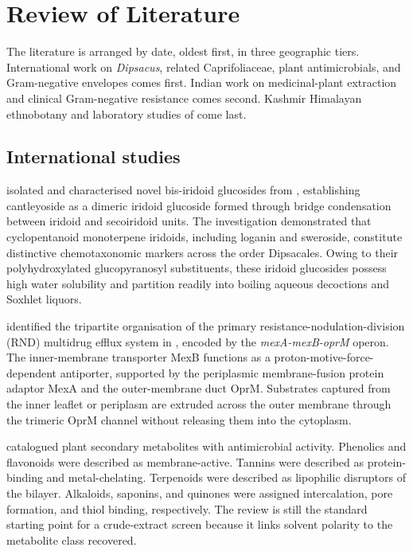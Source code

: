 
\chapter{Review of Literature}\label{ch:litreview}

The literature is arranged by date, oldest first, in three geographic tiers. International work on \textit{Dipsacus}, related Caprifoliaceae, plant antimicrobials, and Gram-negative envelopes comes first. Indian work on medicinal-plant extraction and clinical Gram-negative resistance comes second. Kashmir Himalayan ethnobotany and laboratory studies of  come last.

\section{International studies}

\citet{jensen1979cantleyoside} isolated and characterised novel bis-iridoid glucosides from , establishing cantleyoside as a dimeric iridoid glucoside formed through bridge condensation between iridoid and secoiridoid units. The investigation demonstrated that cyclopentanoid monoterpene iridoids, including loganin and sweroside, constitute distinctive chemotaxonomic markers across the order Dipsacales. Owing to their polyhydroxylated glucopyranosyl substituents, these iridoid glucosides possess high water solubility and partition readily into boiling aqueous decoctions and Soxhlet liquors.

\citet{li1995role} identified the tripartite organisation of the primary resistance-nodulation-division (RND) multidrug efflux system in , encoded by the \textit{mexA-mexB-oprM} operon. The inner-membrane transporter MexB functions as a proton-motive-force-dependent antiporter, supported by the periplasmic membrane-fusion protein adaptor MexA and the outer-membrane duct OprM. Substrates captured from the inner leaflet or periplasm are extruded across the outer membrane through the trimeric OprM channel without releasing them into the cytoplasm.

\citet{cowan1999plant} catalogued plant secondary metabolites with antimicrobial activity. Phenolics and flavonoids were described as membrane-active. Tannins were described as protein-binding and metal-chelating. Terpenoids were described as lipophilic disruptors of the bilayer. Alkaloids, saponins, and quinones were assigned intercalation, pore formation, and thiol binding, respectively. The review is still the standard starting point for a crude-extract screen because it links solvent polarity to the metabolite class recovered.

